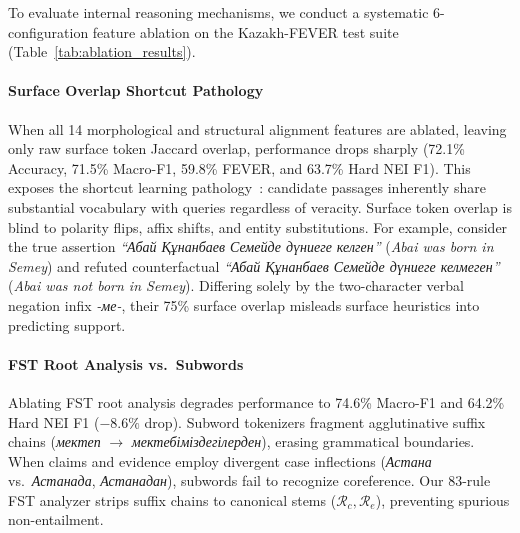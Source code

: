 To evaluate internal reasoning mechanisms, we conduct a systematic 6-configuration feature ablation on the Kazakh-FEVER test suite (Table~\ref{tab:ablation_results}).

\begin{table}[t]
\centering
\small
\caption{Morphological feature ablation study on the Kazakh-FEVER test suite. Best results in bold.}
\label{tab:ablation_results}
\end{table}

\paragraph{Surface Overlap Shortcut Pathology}
When all 14 morphological and structural alignment features are ablated, leaving only raw surface token Jaccard overlap, performance drops sharply (72.1\% Accuracy, 71.5\% Macro-F1, 59.8\% FEVER, and 63.7\% Hard NEI F1). This exposes the shortcut learning pathology~\citep{wang-etal-2024-factcheck-bench}: candidate passages inherently share substantial vocabulary with queries regardless of veracity. Surface token overlap is blind to polarity flips, affix shifts, and entity substitutions. For example, consider the true assertion \textit{``Абай Құнанбаев Семейде дүниеге келген''} (\textit{Abai was born in Semey}) and refuted counterfactual \textit{``Абай Құнанбаев Семейде дүниеге келмеген''} (\textit{Abai was not born in Semey}). Differing solely by the two-character verbal negation infix \textit{-ме-}, their 75\% surface overlap misleads surface heuristics into predicting support.

\paragraph{FST Root Analysis vs.\ Subwords}
Ablating FST root analysis degrades performance to 74.6\% Macro-F1 and 64.2\% Hard NEI F1 ($-8.6\%$ drop). Subword tokenizers fragment agglutinative suffix chains (\textit{мектеп} $\rightarrow$ \textit{мектебіміздегілерден}), erasing grammatical boundaries. When claims and evidence employ divergent case inflections (\textit{Астана} vs.\ \textit{Астанада}, \textit{Астанадан}), subwords fail to recognize coreference. Our 83-rule FST analyzer strips suffix chains to canonical stems ($\mathcal{R}_c, \mathcal{R}_e$), preventing spurious non-entailment.

